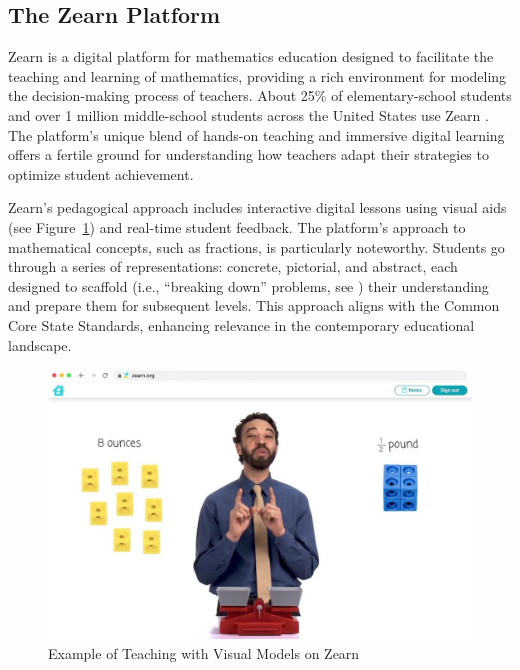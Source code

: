 \documentclass[
  number,
  preprint,
  3p,
  onecolumn]{elsarticle}
\begin{document}
\hypertarget{the-zearn-platform}{%
\subsection{The Zearn Platform}\label{the-zearn-platform}}

Zearn is a digital platform for mathematics education designed to
facilitate the teaching and learning of mathematics, providing a rich
environment for modeling the decision-making process of teachers. About
25\% of elementary-school students and over 1 million middle-school
students across the United States use Zearn \citep{post-weblog}. The
platform's unique blend of hands-on teaching and immersive digital
learning offers a fertile ground for understanding how teachers adapt
their strategies to optimize student achievement.

Zearn's pedagogical approach includes interactive digital lessons using
visual aids (see Figure~\ref{fig-zearn-poster}) and real-time student
feedback. The platform's approach to mathematical concepts, such as
fractions, is particularly noteworthy. Students go through a series of
representations: concrete, pictorial, and abstract, each designed to
scaffold (i.e., ``breaking down'' problems, see
\citep{jumaat2014, reiser2014}) their understanding and prepare them for
subsequent levels. This approach aligns with the Common Core State
Standards, enhancing relevance in the contemporary educational
landscape.

\begin{figure}

{\centering \includegraphics{images/zearn-poster.jpg}

}

\caption{\label{fig-zearn-poster}Example of Teaching with Visual Models
on Zearn}

\end{figure}
\end{document}
